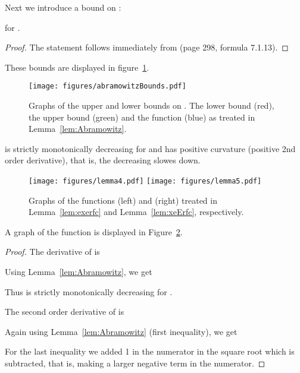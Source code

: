 \documentclass{article}
\begin{document}
Next we introduce a bound on :
\begin{lemma}
\label{lem:Abramowitz}


for . 
\end{lemma}
\begin{proof}
The statement follows immediately from 
\citep{Abramowitz:64} (page 298, formula 7.1.13).
\end{proof}

These bounds are displayed in figure~\ref{fig:abramowitz}.    
\begin{figure}
 \centering
 \texttt{[image: figures/abramowitzBounds.pdf]}
 \caption[Graph of the Abramowitz bound for the complementary error function.]{Graphs of the upper and lower bounds on .  The lower bound  (red),  
  the upper bound  (green) and the function  (blue) as 
  treated in Lemma~\ref{lem:Abramowitz}. \label{fig:abramowitz}}
\end{figure} 


\begin{lemma}[Function ]
\label{lem:exerfc}

 is strictly monotonically decreasing for  
and has positive curvature 
(positive 2nd order derivative), that is, the decreasing slowes down.
\end{lemma}

\begin{figure}
 \texttt{[image: figures/lemma4.pdf]}
 \texttt{[image: figures/lemma5.pdf]}
 \caption[Graphs of the functions   and .]{Graphs of the functions   (left) and  (right) treated in Lemma~\ref{lem:exerfc} and Lemma~\ref{lem:xeErfc}, 
 respectively. \label{fig:lemma4}}
\end{figure} 

A graph of the function is displayed in Figure~\ref{fig:lemma4}.

\begin{proof}
The derivative of  is

Using Lemma~\ref{lem:Abramowitz}, we get

Thus 
is strictly monotonically decreasing for .

The second order derivative of  is


Again using Lemma~\ref{lem:Abramowitz} (first inequality), we get

For the last inequality we added 1 in the numerator in the square root
which is subtracted, that is, making a larger negative term in the
numerator. 
\end{proof}
\end{document}
